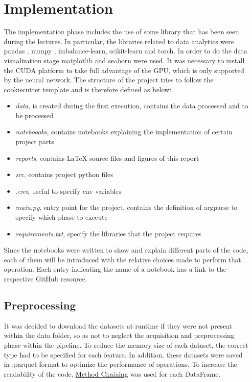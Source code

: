 \documentclass[../main]{subfiles}
\begin{document}
\chapter{Implementation}
The implementation phase includes the use of some library that has been seen during the lectures.
In particular, the libraries related to data analytics were pandas \cite{reback2020pandas}, numpy \cite{harris2020array}, imbalance-learn, scikit-learn and torch.
In order to do the data visualization stage matplotlib \cite{Hunter:2007} and seaborn \cite{Waskom2021} were used.
It was necessary to install the CUDA platform \cite{cuda} to take full advantage of the GPU, which is only supported by the neural network.
The structure of the project tries to follow the cookiecutter template \cite{site:cookiecutter} and is therefore defined as below:
\begin{itemize}
    \item \textit{data}, is created during the first execution, contains the data processed and to be processed
    \item \textit{noteboooks}, contains notebooks explaining the implementation of certain project parts
    \item \textit{reports}, contains LaTeX source files and figures of this report
    \item \textit{src}, contains project python files
    \item \textit{.env}, useful to specify env variables
    \item \textit{main.py}, entry point for the project, contains the definition of argparse to specify which phase to execute
    \item \textit{requirements.txt}, specify the libraries that the project requires
\end{itemize}
Since the notebooks were written to show and explain different parts of the code, each of them will be introduced with the relative choices made to perform that operation.
Each entry indicating the name of a notebook has a link to the respective GitHub resource.

\section{Preprocessing}
It was decided to download the datasets at runtime if they were not present within the data folder, so as not to neglect the acquisition and preprocessing phase within the pipeline.
To reduce the memory size of each dataset, the correct type had to be specified for each feature.
In addition, these datasets were saved in .parquet format to optimize the performance of operations.
To increase the readability of the code, \href{https://tomaugspurger.github.io/method-chaining.html}{Method Chaining} was used for each DataFrame.
\end{document}
